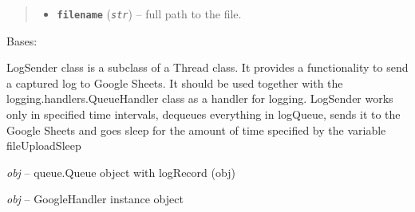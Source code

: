 \documentclass[letterpaper,10pt,english,openany]{sphinxmanual}
\begin{document}
\begin{fulllineitems}
\begin{fulllineitems}
\begin{quote}
\begin{description}
\begin{itemize}
\item {} 
\textbf{\texttt{filename}} (\emph{\texttt{str}}) -- full path to the file.

\end{itemize}

\end{description}\end{quote}

\end{fulllineitems}


\end{fulllineitems}


\begin{fulllineitems}
\label{rpicameramon:rpicameramon.telemetry.LogSender}
Bases: 

LogSender class is a subclass of a Thread class.
It provides a functionality to send a captured log to
Google Sheets. It should be used together with the
logging.handlers.QueueHandler class as a handler for logging.
LogSender works only in specified time intervals,
dequeues everything in logQueue, sends it
to the Google Sheets and goes sleep for the amount of time
specified by the variable fileUploadSleep

\begin{fulllineitems}
\label{rpicameramon:rpicameramon.telemetry.LogSender.logQueue}
\emph{obj} -- queue.Queue object with logRecord (obj)

\end{fulllineitems}


\begin{fulllineitems}
\label{rpicameramon:rpicameramon.telemetry.LogSender.enqueued}
\end{fulllineitems}


\begin{fulllineitems}
\label{rpicameramon:rpicameramon.telemetry.LogSender.googleHandler}
\emph{obj} -- GoogleHandler instance object

\end{fulllineitems}


\begin{fulllineitems}
\label{rpicameramon:rpicameramon.telemetry.LogSender.run}
\end{fulllineitems}


\end{fulllineitems}
\end{document}
